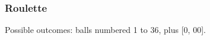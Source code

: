 \documentclass[handout]{beamer}
\begin{document}


   \begin{frame}
   \frametitle{Roulette}
   \begin{center}
   \end{center}
   Possible outcomes: balls numbered 1 to 36, plus [0, 00].
   \end{frame}

\end{document}
